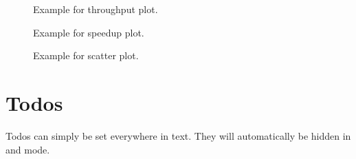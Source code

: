 \begin{figure}[t]
  \begin{center}
    
  \end{center}
  \caption{Example for throughput plot.}
  \label{fig:throughput}
\end{figure}

\begin{figure}[t]
  \begin{center}
    
  \end{center}
  \caption{Example for speedup plot.}
  \label{fig:speedup}
\end{figure}

\begin{figure}[t]
  \begin{center}
    
  \end{center}
  \caption{Example for scatter plot.}
  \label{fig:scatter}
\end{figure}

\section{Todos}
Todos can simply be set everywhere in text. They will
automatically be hidden in  and  mode.

